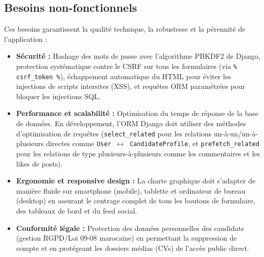 \subsection{Besoins non-fonctionnels}
Ces besoins garantissent la qualité technique, la robustesse et la pérennité de l'application :
\begin{itemize}
    \item \textbf{Sécurité :} Hashage des mots de passe avec l'algorithme PBKDF2 de Django, protection systématique contre le CSRF sur tous les formulaires (via \texttt{\% csrf\_token \%}), échappement automatique du HTML pour éviter les injections de scripts intersites (XSS), et requêtes ORM paramétrées pour bloquer les injections SQL.
    \item \textbf{Performance et scalabilité :} Optimisation du temps de réponse de la base de données. En développement, l'ORM Django doit utiliser des méthodes d'optimisation de requêtes (\texttt{select\_related} pour les relations un-à-un/un-à-plusieurs directes comme \texttt{User $\leftrightarrow$ CandidateProfile}, et \texttt{prefetch\_related} pour les relations de type plusieurs-à-plusieurs comme les commentaires et les likes de posts).
    \item \textbf{Ergonomie et responsive design :} La charte graphique doit s'adapter de manière fluide sur smartphone (mobile), tablette et ordinateur de bureau (desktop) en assurant le centrage complet de tous les boutons de formulaire, des tableaux de bord et du feed social.
    \item \textbf{Conformité légale :} Protection des données personnelles des candidats (gestion RGPD\allowbreak/Loi 09-08 marocaine) en permettant la suppression de compte et en protégeant les dossiers médias (CVs) de l'accès public direct.
\end{itemize}

